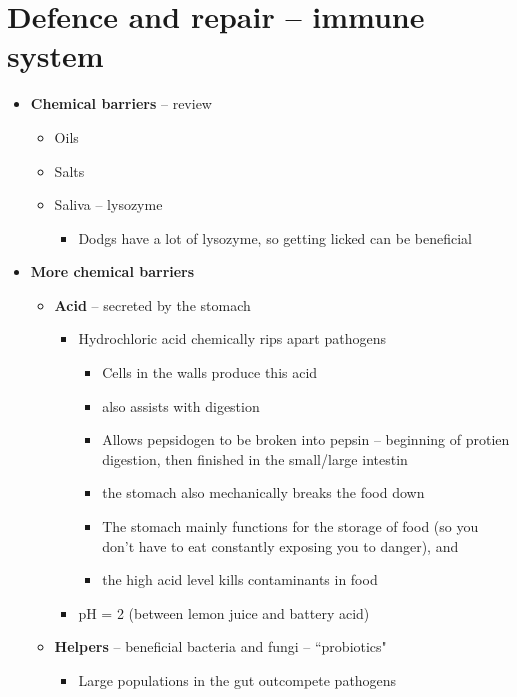 \documentclass{article}
\theoremstyle{definition}
\begin{document}
\section{Defence and repair -- immune system}
\begin{itemize}
	\item \textbf{Chemical barriers}  -- review
		\begin{itemize}
			\item Oils
			\item  Salts
			\item Saliva -- lysozyme
				\begin{itemize}
					\item Dodgs have a lot of lysozyme, so getting licked can be beneficial
				\end{itemize}
		\end{itemize}
	\item \textbf{More chemical barriers} 
		\begin{itemize}
			\item \textbf{Acid}  -- secreted by the stomach
				\begin{itemize}
					\item Hydrochloric acid chemically rips apart  pathogens
						\begin{itemize}
							\item Cells in the walls produce this acid
							\item also assists with digestion
							\item Allows pepsidogen to be broken into pepsin -- beginning of protien digestion, then finished in the small/large intestin
							\item the stomach also mechanically breaks the food down
							\item The stomach mainly functions for the storage of food (so you don't have to eat constantly exposing you to danger), and 
							\item the high acid level kills contaminants in food
						\end{itemize}
					\item pH = 2 (between lemon juice and battery acid)
				\end{itemize}
			\item \textbf{Helpers}  -- beneficial bacteria and fungi -- ``probiotics"
				\begin{itemize}
					\item Large populations in the gut outcompete pathogens
						\begin{itemize}

\end{itemize}
\end{itemize}
\end{itemize}
\end{itemize}
\end{document}
